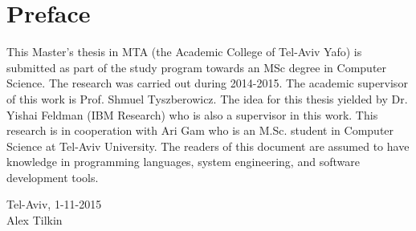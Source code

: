 \section*{Preface}
This Master's thesis in MTA (the Academic College of Tel-Aviv Yafo) is submitted as part of the study program towards an MSc degree in Computer Science. The research was carried out during 2014-2015. The academic supervisor of this work is Prof. Shmuel Tyszberowicz. The idea for this thesis yielded by Dr. Yishai Feldman (IBM Research) who is also a supervisor in this work. This research is in cooperation with Ari Gam who is an M.Sc. student in Computer Science at Tel-Aviv University. The readers of this document are assumed to have knowledge in programming languages, system engineering, and software development tools.\\[2cm]

\begin{center}
Tel-Aviv, 1-11-2015\\[1pc]
Alex Tilkin
\end{center}